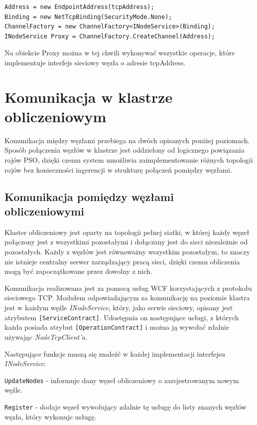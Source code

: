 \documentclass[12pt, twoside, openany, abstract=on]{report}
\theoremstyle{definition}
\begin{document}
\lstset{style=sharpc}
\begin{lstlisting}[frame=single]
Address = new EndpointAddress(tcpAddress);
Binding = new NetTcpBinding(SecurityMode.None);
ChannelFactory = new ChannelFactory<INodeService>(Binding);
INodeService Proxy = ChannelFactory.CreateChannel(Address);
\end{lstlisting}             

Na obiekcie Proxy można w tej chwili wykonywać wszystkie operacje, które implementuje interfejs sieciowy węzła o adresie tcpAddress.

\section{Komunikacja w klastrze obliczeniowym}
Komunikacja między węzłami przebiega na dwóch opisanych poniżej poziomach. Sposób połączenia węzłów w klastrze jest oddzielony od logicznego powiązania rojów PSO, dzięki czemu system umożliwia zaimplementowanie różnych topologii rojów bez konieczności ingerencji w strukturę połączeń pomiędzy węzłami.

\subsection{Komunikacja pomiędzy węzłami obliczeniowymi}
Klaster obliczeniowy jest oparty na topologii pełnej siatki, w której każdy węzeł połączony jest z wszystkimi pozostałymi i dołączany jest do sieci niezależnie od pozostałych. Każdy z węzłów jest równoważny wszystkim pozostałym, to znaczy nie istnieje centralny serwer zarządzający pracą sieci, dzięki czemu obliczenia mogą być zapoczątkowane przez dowolny z nich.

Komunikacja realizowana jest za pomocą usług WCF korzystających z protokołu sieciowego TCP. Modułem odpowiadającym za komunikację na poziomie klastra jest w każdym węźle \textit{INodeService}, który, jako serwis sieciowy, opisany jest atrybutem \texttt{[ServiceContract]}. Udostępnia on następujące usługi, z których każda posiada atrybut \texttt{[OperationContract]} i można ją wywołać zdalnie używając \textit{NodeTcpClient'a}.

Następujące funkcje muszą się znaleźć w każdej implementacji interfejsu \textit{INodeService}:

\texttt{UpdateNodes} - informuje dany węzeł obliczeniowy o zarejestrowanym nowym węźle.

\texttt{Register} - dodaje węzeł wywołujący zdalnie tę usługę do listy znanych węzłów węzła, który wykonuje usługę.
\end{document}
